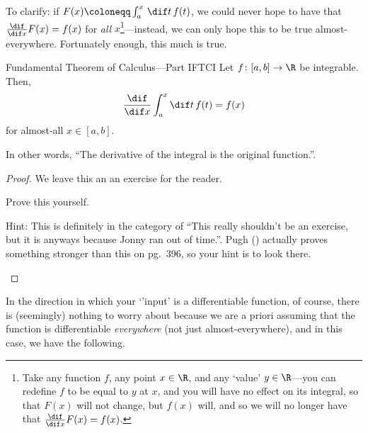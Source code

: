 To clarify:  if $F(x)\coloneqq \int _a^x\, \dif t\, f(t)$, we could never hope to have that $\frac{\dif}{\dif x}F(x)=f(x)$ for \emph{all} $x$\footnote{Take any function $f$, any point $x\in \R$, and any `value' $y\in \R$---you can redefine $f$ to be equal to $y$ at $x$, and you will have no effect on its integral, so that $F(x)$ will not change, but $f(x)$ will, and so we will no longer have that $\frac{\dif}{\dif x}F(x)=f(x)$.}---instead, we can only hope this to be true almost-everywhere.  Fortunately enough, this much is true.
\begin{thm}{Fundamental Theorem of Calculus---Part I}{FTCI}
Let $f\colon [a,b]\rightarrow \R$ be integrable.  Then,
\begin{equation}
\frac{\dif}{\dif x}\int _a^x\dif t\, f(t)=f(x)
\end{equation}
for almost-all $x\in [a,b]$.
\begin{rmk}
In other words, ``The derivative of the integral is the original function.''.
\end{rmk}
\begin{proof}
We leave this an an exercise for the reader.
\begin{exr}[breakable=false]{}{}
Prove this yourself.
\begin{rmk}
Hint:  This is definitely in the category of ``This really shouldn't be an exercise, but it is anyways because Jonny ran out of time.''.  Pugh (\cite{Pugh}) actually proves something stronger than this on pg.~396, so your hint is to look there.
\end{rmk}
\end{exr}
\end{proof}
\end{thm}
In the direction in which your `'input' is a differentiable function, of course, there is (seemingly) nothing to worry about because we are a priori assuming that the function is differentiable \emph{everywhere} (not just almost-everywhere), and in this case, we have the following.
